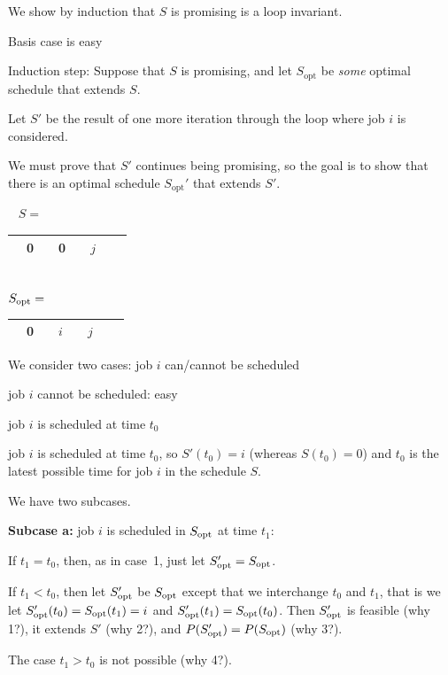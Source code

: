 \begin{frame}
We show by induction that $S$ is promising is a loop invariant.

Basis case is easy

Induction step: Suppose that $S$ is promising, and let
$S_{\text{opt}}$ be {\em some} optimal schedule that extends $S$.

Let $S'$ be the result of one more iteration through the loop where
job $i$ is considered.  

We must prove that $S'$ continues being
promising, so the goal is to show that there is an optimal schedule
$S_{\text{opt}}'$ that extends $S'$.

\begin{center}
\ \hskip 2.7mm $S=$ \begin{tabular}{|c|c|c|c|c|c|c|c|}\hline
 & 0 &  & 0 &  & $j$ &  &  \\\hline
\end{tabular} \\[5mm]
$S_{\mathrm{opt}}=$ \begin{tabular}{|c|c|c|c|c|c|c|c|}\hline
 & 0 &  & $i$  &  & $j$ &  &  \\\hline
\end{tabular}
\end{center}
\end{frame}

\begin{frame}
We consider two cases: job $i$ can/cannot be scheduled 

job $i$ cannot be scheduled: easy

job $i$ is scheduled at time $t_0$

job $i$ is scheduled at time $t_0$, so
$S'(t_0)=i$ (whereas $S(t_0)=0$) and $t_0$ is the latest possible time
for job $i$ in the schedule $S$.  

We have two subcases.
\end{frame}

\begin{frame}
\noindent\textbf{Subcase a:} job $i$ is scheduled in $S_{\mathrm{opt}}$ at time
$t_1$: 

If $t_1=t_0$, then, as in case~1, just let
$S_{\mathrm{opt}}'=S_{\mathrm{opt}}$. 

If $t_1<t_0$, then let $S_{\mathrm{opt}}'$ be $S_{\mathrm{opt}}$ except that we interchange
$t_0$ and $t_1$, that is we let $S_{\mathrm{opt}}'(t_0)=S_{\mathrm{opt}}(t_1)=i$ and
$S_{\mathrm{opt}}'(t_1)=S_{\mathrm{opt}}(t_0)$. Then $S_{\mathrm{opt}}'$ is feasible (why 1?), it extends
$S'$ (why 2?), and $P(S_{\mathrm{opt}}')=P(S_{\mathrm{opt}})$ (why 3?). 

The case $t_1>t_0$ is not possible (why 4?).
\end{frame}

